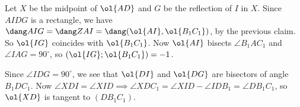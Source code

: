 \documentclass[11pt]{scrartcl}
\begin{document}
Let $X$ be the midpoint of $\ol{AD}$ and $G$ be the reflection of $I$ in $X$. Since $AIDG$ is a rectangle, we have $\dang AIG=\dang ZAI=\dang (\ol{AI}, \ol{B_1C_1})$, by the previous claim. So $\ol{IG}$ coincides with $\ol{B_1C_1}$. Now $\ol{AI}$ bisects $\angle B_1AC_1$ and $\angle IAG=90^{\circ}$, so $(\ol{IG}; \ol{B_1C_1})=-1$.

Since $\angle IDG=90^{\circ}$, we see that $\ol{DI}$ and $\ol{DG}$ are bisectors of angle $B_1DC_1$. Now $\angle XDI=\angle XID \implies \angle XDC_1=\angle XID-\angle IDB_1=\angle DB_1C_1$, so $\ol{XD}$ is tangent to $(DB_1C_1)$.
\pagebreak
\end{document}

